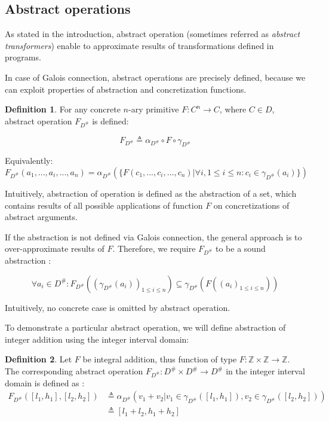 \documentclass[12pt,oneside]{fithesis2}
\theoremstyle{definition}
\newtheorem{definition}{Definition}
\begin{document}
\subsection{Abstract operations}\label{sec:operations}

As stated in the introduction, abstract operation (sometimes referred as \textit{abstract transformers}) enable to approximate results of transformations defined in programs.

In case of Galois connection, abstract operations are precisely defined, because we can exploit properties of abstraction and concretization functions.

\begin{definition}\label{def:operation-galois}
  For any concrete $n$-ary primitive $F: C^n \to C$, where $C \in D$, abstract operation $F_{D^\#}$ is defined: \cite{mine-AIAA10}

  \[
    F_{D^\#} \triangleq \alpha_{D^\#} \circ F \circ \gamma_{D^\#}
  \]

  Equivalently:
  \[
    F_{D^\#}(a_1,..., a_i, ..., a_n) =  \alpha_{D^\#}(\{F(c_1,..., c_i, ..., c_n) | \forall i, 1 \le i \le n: c_i \in \gamma_{D^\#}(a_i)\})
  \]
\end{definition}

Intuitively, abstraction of operation is defined as the abstraction of a set, which contains results of all possible applications of function $F$ on concretizations of abstract arguments.

If the abstraction is not defined via Galois connection, the general approach is to over-approximate results of $F$. Therefore, we require $F_{D^\#}$ to be a sound abstraction \cite{CousotEtAl06-ASIAN}:

\[
  \forall a_i \in D^\#: F_{D^\#}((\gamma_{D^\#}(a_i))_{1 \le i \le n}) \subseteq \gamma_{D^\#}(F((a_i)_{1 \le i \le n}))
\]

Intuitively, no concrete case is omitted by abstract operation.

To demonstrate a particular abstract operation, we will define abstraction of integer addition using the integer interval domain:

\begin{definition}
  Let $F$ be integral addition, thus function of type $F: \mathbb Z \times \mathbb Z \to \mathbb Z$. The corresponding abstract operation $F_{D^\#}: D^\# \times D^\# \to D^\#$ in the integer interval domain is defined as \cite{mine-WING12}:
  \begin{align*}
    F_{D^\#}([l_1, h_1], [l_2, h_2]) &\triangleq \alpha_{D^\#}\left( v_1 + v_2 | v_1 \in \gamma_{D^\#}([l_1, h_1]), v_2 \in \gamma_{D^\#}([l_2, h_2]) \right)\\
    &\triangleq [l_1 + l_2, h_1 + h_2]
  \end{align*}
\end{definition}
\end{document}
